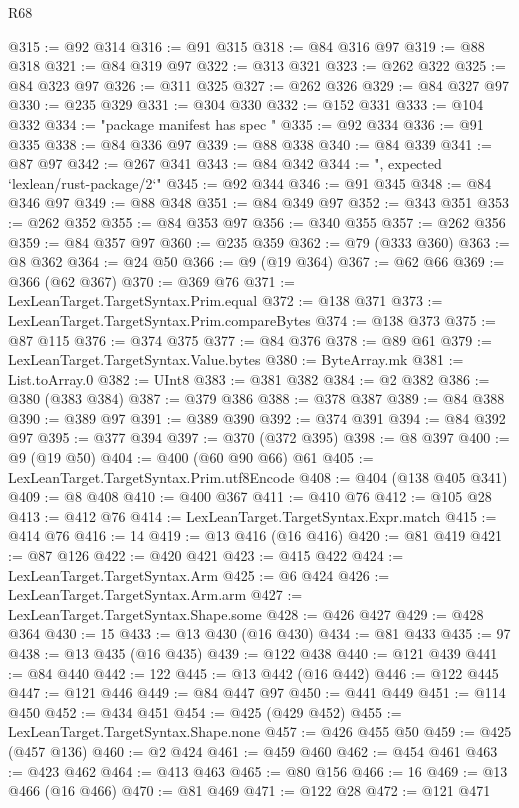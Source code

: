\begin{lexlean}{R68}
\begin{coremodule}
@315 := @92 @314
@316 := @91 @315
@318 := @84 @316 @97
@319 := @88 @318
@321 := @84 @319 @97
@322 := @313 @321
@323 := @262 @322
@325 := @84 @323 @97
@326 := @311 @325
@327 := @262 @326
@329 := @84 @327 @97
@330 := @235 @329
@331 := @304 @330
@332 := @152 @331
@333 := @104 @332
@334 := "package manifest has spec "
@335 := @92 @334
@336 := @91 @335
@338 := @84 @336 @97
@339 := @88 @338
@340 := @84 @339
@341 := @87 @97
@342 := @267 @341
@343 := @84 @342
@344 := ", expected `lexlean/rust-package/2`"
@345 := @92 @344
@346 := @91 @345
@348 := @84 @346 @97
@349 := @88 @348
@351 := @84 @349 @97
@352 := @343 @351
@353 := @262 @352
@355 := @84 @353 @97
@356 := @340 @355
@357 := @262 @356
@359 := @84 @357 @97
@360 := @235 @359
@362 := @79 (@333 @360)
@363 := @8 @362
@364 := @24 @50
@366 := @9 (@19 @364)
@367 := @62 @66
@369 := @366 (@62 @367)
@370 := @369 @76
@371 := LexLeanTarget.TargetSyntax.Prim.equal
@372 := @138 @371
@373 := LexLeanTarget.TargetSyntax.Prim.compareBytes
@374 := @138 @373
@375 := @87 @115
@376 := @374 @375
@377 := @84 @376
@378 := @89 @61
@379 := LexLeanTarget.TargetSyntax.Value.bytes
@380 := ByteArray.mk
@381 := List.toArray.{0}
@382 := UInt8
@383 := @381 @382
@384 := @2 @382
@386 := @380 (@383 @384)
@387 := @379 @386
@388 := @378 @387
@389 := @84 @388
@390 := @389 @97
@391 := @389 @390
@392 := @374 @391
@394 := @84 @392 @97
@395 := @377 @394
@397 := @370 (@372 @395)
@398 := @8 @397
@400 := @9 (@19 @50)
@404 := @400 (@60 @90 @66) @61
@405 := LexLeanTarget.TargetSyntax.Prim.utf8Encode
@408 := @404 (@138 @405 @341)
@409 := @8 @408
@410 := @400 @367
@411 := @410 @76
@412 := @105 @28
@413 := @412 @76
@414 := LexLeanTarget.TargetSyntax.Expr.match
@415 := @414 @76
@416 := 14
@419 := @13 @416 (@16 @416)
@420 := @81 @419
@421 := @87 @126
@422 := @420 @421
@423 := @415 @422
@424 := LexLeanTarget.TargetSyntax.Arm
@425 := @6 @424
@426 := LexLeanTarget.TargetSyntax.Arm.arm
@427 := LexLeanTarget.TargetSyntax.Shape.some
@428 := @426 @427
@429 := @428 @364
@430 := 15
@433 := @13 @430 (@16 @430)
@434 := @81 @433
@435 := 97
@438 := @13 @435 (@16 @435)
@439 := @122 @438
@440 := @121 @439
@441 := @84 @440
@442 := 122
@445 := @13 @442 (@16 @442)
@446 := @122 @445
@447 := @121 @446
@449 := @84 @447 @97
@450 := @441 @449
@451 := @114 @450
@452 := @434 @451
@454 := @425 (@429 @452)
@455 := LexLeanTarget.TargetSyntax.Shape.none
@457 := @426 @455 @50
@459 := @425 (@457 @136)
@460 := @2 @424
@461 := @459 @460
@462 := @454 @461
@463 := @423 @462
@464 := @413 @463
@465 := @80 @156
@466 := 16
@469 := @13 @466 (@16 @466)
@470 := @81 @469
@471 := @122 @28
@472 := @121 @471

\end{coremodule}
\end{lexlean}
